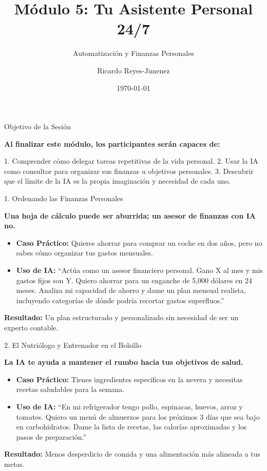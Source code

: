 \documentclass[aspectratio=169]{beamer}
\title[Módulo 5: Tu Asistente Persona]{Módulo 5: Tu Asistente Personal 24/7}
\subtitle{Automatización y Finanzas Personales}
\author{Ricardo Reyes-Jimenez}
\institute{IA para Todos}
\date{\today}
\begin{document}
\begin{frame}
  \titlepage
\end{frame}

\usebackgroundtemplate{}



\begin{frame}[fragile]{Objetivo de la Sesión}


\textbf{Al finalizar este módulo, los participantes serán capaces de:}

1. Comprender cómo delegar tareas repetitivas de la vida personal.
2. Usar la IA como consultor para organizar sus finanzas u objetivos personales.
3. Descubrir que el límite de la IA es la propia imaginación y necesidad de cada uno.

\end{frame}



\begin{frame}[fragile]{1. Ordenando las Finanzas Personales}


\textbf{Una hoja de cálculo puede ser aburrida; un asesor de finanzas con IA no.}

\begin{itemize}
  \item \textbf{Caso Práctico:} Quieres ahorrar para comprar un coche en dos años, pero no sabes cómo organizar tus gastos mensuales.
  \item \textbf{Uso de IA:} ``Actúa como un asesor financiero personal. Gano X al mes y mis gastos fijos son Y. Quiero ahorrar para un enganche de 5,000 dólares en 24 meses. Analiza mi capacidad de ahorro y dame un plan mensual realista, incluyendo categorías de dónde podría recortar gastos superfluos.''
\end{itemize}
\textbf{Resultado:} Un plan estructurado y personalizado sin necesidad de ser un experto contable.

\end{frame}



\begin{frame}[fragile]{2. El Nutriólogo y Entrenador en el Bolsillo}


\textbf{La IA te ayuda a mantener el rumbo hacia tus objetivos de salud.}

\begin{itemize}
  \item \textbf{Caso Práctico:} Tienes ingredientes específicos en la nevera y necesitas recetas saludables para la semana.
  \item \textbf{Uso de IA:} ``En mi refrigerador tengo pollo, espinacas, huevos, arroz y tomates. Quiero un menú de almuerzos para los próximos 3 días que sea bajo en carbohidratos. Dame la lista de recetas, las calorías aproximadas y los pasos de preparación.''
\end{itemize}
\textbf{Resultado:} Menos desperdicio de comida y una alimentación más alineada a tus metas.

\end{frame}
\end{document}
